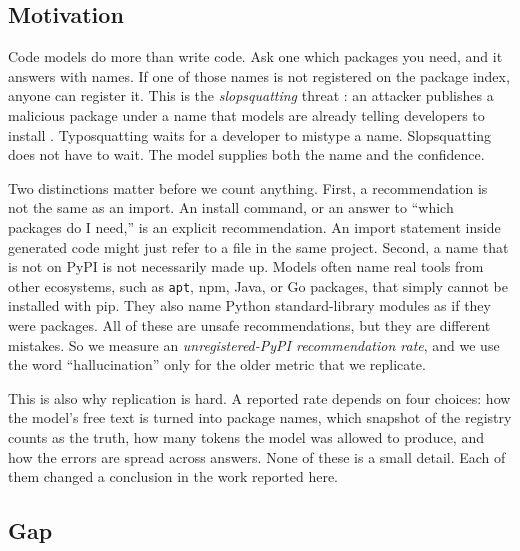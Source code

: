 \documentclass[10pt,twocolumn,letterpaper]{article}
\begin{document}
\subsection{Motivation}

Code models do more than write code. Ask one which packages you need, and it answers with names. If
one of those names is not registered on the package index, anyone can register it. This is the
\emph{slopsquatting} threat \citep{nesbitt2025slopsquatting,gooding2025slopsquatting}: an attacker
publishes a malicious package under a name that models are already telling developers to install
\citep{lanyado2023trust,lanyado2024diving,spracklen2025package}. Typosquatting
\citep{neupane2023beyond,ohm2020backstabber,zimmermann2019small,ladisa2023sok} waits for a developer
to mistype a name. Slopsquatting does not have to wait. The model supplies both the name and the
confidence.

Two distinctions matter before we count anything. First, a recommendation is not the same as an
import. An install command, or an answer to ``which packages do I need,'' is an explicit
recommendation. An import statement inside generated code might just refer to a file in the same
project. Second, a name that is not on PyPI is not necessarily made up. Models often name real tools
from other ecosystems, such as \texttt{apt}, npm, Java, or Go packages, that simply cannot be
installed with pip. They also name Python standard-library modules as if they were packages. All of
these are unsafe recommendations, but they are different mistakes. So we measure an
\emph{unregistered-PyPI recommendation rate}, and we use the word ``hallucination'' only for the
older metric that we replicate.

This is also why replication is hard. A reported rate depends on four choices: how the model's free
text is turned into package names, which snapshot of the registry counts as the truth, how many
tokens the model was allowed to produce, and how the errors are spread across answers. None of these
is a small detail. Each of them changed a conclusion in the work reported here.

\subsection{Gap}
\end{document}

